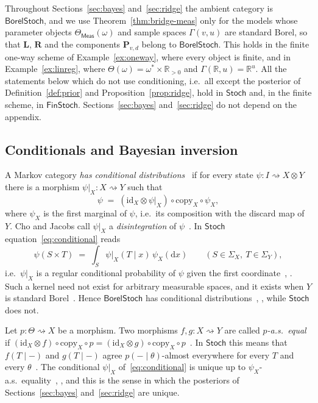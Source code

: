 \documentclass[11pt,a4paper]{article}
\theoremstyle{plain}
\theoremstyle{definition}
\theoremstyle{remark}
\newcommand{\cat}[1]{\mathsf{#1}}
\newcommand{\Meas}{\cat{Meas}}
\newcommand{\Stoch}{\cat{Stoch}}
\newcommand{\FinStoch}{\cat{FinStoch}}
\newcommand{\id}{\mathrm{id}}
\newcommand{\R}{\mathbb{R}}
\newcommand{\BorelStoch}{\cat{BorelStoch}}
\begin{document}
Throughout Sections~\ref{sec:bayes} and~\ref{sec:ridge} the ambient category is
$\BorelStoch$, and we use Theorem~\ref{thm:bridge-meas} only for the models
whose parameter objects $\Theta_\Meas(\omega)$ and sample spaces
$\Gamma(v,u)$ are standard Borel, so that $\mathbf{L}$, $\mathbf{R}$ and the
components $\mathbf P_{v,d}$ belong to $\BorelStoch$. This holds in the finite
one-way scheme of Example~\ref{ex:oneway}, where every object is finite, and in
Example~\ref{ex:linreg}, where $\Theta(\omega) = \omega^{*}\times\R_{>0}$ and
$\Gamma(\R,u) = \R^{u}$. All the statements below which do not use
conditioning, i.e.\ all except the posterior of Definition~\ref{def:prior} and
Proposition~\ref{prop:ridge}, hold in $\Stoch$ and, in the finite scheme, in
$\FinStoch$. Sections~\ref{sec:bayes} and~\ref{sec:ridge} do not depend on the
appendix.

\subsection{Conditionals and Bayesian inversion}

A Markov category \emph{has conditional
distributions}~\cite[Def.~11.1]{fritz_synthetic_2020} if for every state
$\psi \colon I \rightsquigarrow X \otimes Y$ there is a morphism
$\psi|_X \colon X \rightsquigarrow Y$ such that
\begin{equation}\label{eq:conditional}
\psi \;=\; (\id_X \otimes \psi|_X) \circ \mathrm{copy}_X \circ \psi_X ,
\end{equation}
where $\psi_X$ is the first marginal of $\psi$, i.e.\ its composition with the
discard map of $Y$. Cho and Jacobs call $\psi|_X$ a \emph{disintegration} of
$\psi$~\cite[Def.~3.5]{cho_disintegration_2019}. In $\Stoch$
equation~\eqref{eq:conditional} reads
\[
\psi(S \times T) \;=\; \int_{S} \psi|_X(T \mid x)\,\psi_X(\mathrm{d}x)
\qquad (S \in \Sigma_X,\ T \in \Sigma_Y),
\]
i.e.\ $\psi|_X$ is a regular conditional probability of $\psi$ given the first
coordinate~\cite[Ex.~11.3, eq.~(11.3)]{fritz_synthetic_2020},
\cite[Ex.~3.7]{cho_disintegration_2019}. Such a kernel need not exist for
arbitrary measurable spaces, and it exists when $Y$ is standard
Borel~\cite[Thm.~3.11]{cho_disintegration_2019}. Hence $\BorelStoch$ has
conditional distributions~\cite[Ex.~11.3]{fritz_synthetic_2020},
\cite[Cor.~3.12]{cho_disintegration_2019}, while $\Stoch$ does not.

Let $p \colon \Theta \rightsquigarrow X$ be a morphism. Two morphisms
$f,g \colon X \rightsquigarrow Y$ are called \emph{$p$-a.s.\ equal} if
$(\id_X \otimes f)\circ\mathrm{copy}_X\circ p =
(\id_X \otimes g)\circ\mathrm{copy}_X\circ p$~\cite[Def.~13.1]{fritz_synthetic_2020}.
In $\Stoch$ this means that $f(T\mid -)$ and $g(T \mid -)$ agree
$p(-\mid\theta)$-almost everywhere for every $T$ and every
$\theta$~\cite[Ex.~13.3]{fritz_synthetic_2020}. The conditional $\psi|_X$
of~\eqref{eq:conditional} is unique up to $\psi_X$-a.s.\
equality~\cite[Prop.~13.7]{fritz_synthetic_2020},
\cite[\S5]{cho_disintegration_2019}, and this is the sense in which the
posteriors of Sections~\ref{sec:bayes} and~\ref{sec:ridge} are unique.
\end{document}
